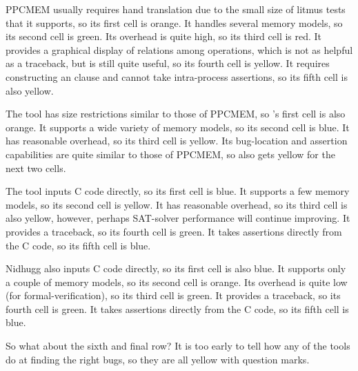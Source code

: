 PPCMEM usually requires hand translation due to the small size of litmus
tests that it supports, so its first cell is orange.
It handles several memory models, so its second cell is green.
Its overhead is quite high, so its third cell is red.
It provides a graphical display of relations among operations, which
is not as helpful as a traceback, but is still quite useful, so its
fourth cell is yellow.
It requires constructing an  clause and cannot take
intra-process assertions, so its fifth cell is also yellow.

The  tool has size restrictions similar to those of PPCMEM,
so 's first cell is also orange.
It supports a wide variety of memory models, so its second cell is blue.
It has reasonable overhead, so its third cell is yellow.
Its bug-location and assertion capabilities are quite similar to those
of PPCMEM, so  also gets yellow for the next two cells.

The  tool inputs C code directly, so its first cell is blue.
It supports a few memory models, so its second cell is yellow.
It has reasonable overhead, so its third cell is also yellow, however,
perhaps SAT-solver performance will continue improving.
It provides a traceback, so its fourth cell is green.
It takes assertions directly from the C code, so its fifth cell is blue.

Nidhugg also inputs C code directly, so its first cell is also blue.
It supports only a couple of memory models, so its second cell is orange.
Its overhead is quite low (for formal-verification), so its
third cell is green.
It provides a traceback, so its fourth cell is green.
It takes assertions directly from the C code, so its fifth cell is blue.

So what about the sixth and final row?
It is too early to tell how any of the tools do at finding the right bugs,
so they are all yellow with question marks.

